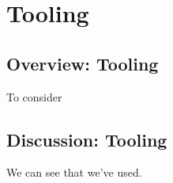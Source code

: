 \documentclass{book}
\begin{document}
	\part{Tooling}
	
	\chapter{Overview: Tooling}
	To consider
	
	
	
	\chapter{Discussion: Tooling}
	We can see that we've used.
\end{document}
